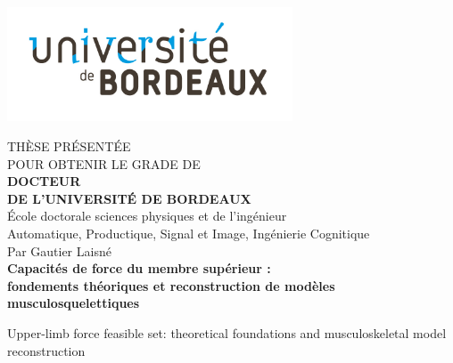 
\begin{titlepage}

    \centering\includegraphics[scale=1, height=3.4cm]{img/page_de_garde/Universite Bordeaux RVB-01.png}
    \hfill
    
    \begin{center}
    
    \doublespacing
    
    THÈSE PRÉSENTÉE\\ POUR OBTENIR LE GRADE DE \\
    {\LARGE \textbf{DOCTEUR\\DE L'UNIVERSITÉ DE BORDEAUX} } \\
    \vspace{0.55cm}
    École doctorale sciences physiques et de l'ingénieur\\
    {\normalsize Automatique, Productique, Signal et Image, Ingénierie Cognitique} \\
    \vspace{0.55cm}
    Par {\large Gautier Laisné} \\
    \vspace{0.55cm}
    {\Large \textbf{Capacités de force du membre supérieur : \\fondements théoriques et reconstruction de modèles musculosquelettiques}}
    
    {\small Upper-limb force feasible set: theoretical foundations and musculoskeletal model reconstruction}


\end{center}
\end{titlepage}
